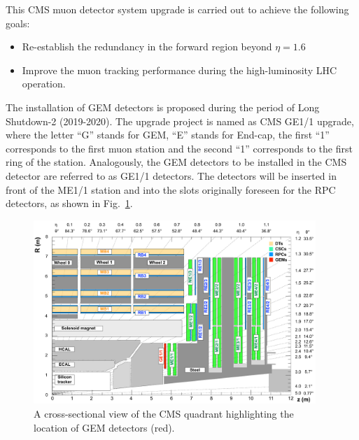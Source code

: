 This CMS muon detector system upgrade is carried out to achieve the following goals:
\begin{itemize}
    \item Re-establish the redundancy in the forward region beyond $\eta = 1.6$
    \item Improve the muon tracking performance during the high-luminosity LHC operation.
\end{itemize}
The installation of GEM detectors is proposed during the period of Long Shutdown-2 (2019-2020).
The upgrade project is named as CMS GE1/1 upgrade, where the letter ``G'' stands for GEM, ``E'' stands for End-cap, the first ``1'' corresponds to the first muon station and the second ``1'' corresponds to the first ring of the station.
Analogously, the GEM detectors to be installed in the CMS detector are referred to as GE1/1 detectors.
The detectors will be inserted in front of the ME1/1 station and into the slots originally foreseen for the RPC detectors, as shown in Fig.~\ref{fig:GE1/1pos}. 
\begin{figure}[!htbp]
    \centering
    \includegraphics[width=0.95\textwidth]{figures/GEM/cms_upg_o_g_b_ni_ge1_r_140227.pdf}
    \caption{A cross-sectional view of the CMS quadrant highlighting the location of GEM detectors (red).}
    \label{fig:GE1/1pos}
\end{figure}

